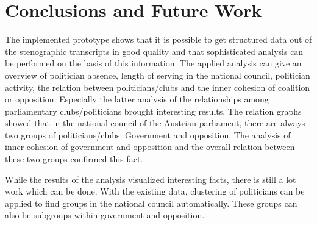 \chapter{Conclusions and Future Work}
\label{chap:conclusion}

The implemented prototype shows that it is possible to get structured data out of the stenographic transcripts in good quality and that sophisticated analysis can be performed on the basis of this information. The applied analysis can give an overview of politician absence, length of serving in the national council, politician activity, the relation between politicians/clubs and the inner cohesion of coalition or opposition. Especially the latter analysis of the relationships among parliamentary clubs/politicians brought interesting results. The relation graphs showed that in the national council of the Austrian parliament, there are always two groups of politicians/clubs: Government and opposition. The analysis of inner cohesion of government and opposition and the overall relation between these two groups confirmed this fact.

While the results of the analysis visualized interesting facts, there is still a lot work which can be done. With the existing data, clustering of politicians can be applied to find groups in the national council automatically. These groups can also be subgroups within government and opposition. 
